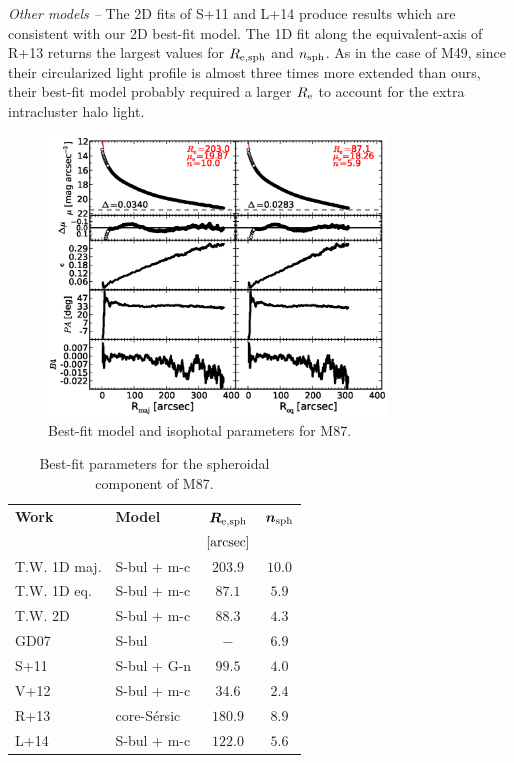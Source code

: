 \documentclass[preprint2]{emulateapj}
\newcommand{\fitfigurewidth}{0.8\textwidth}
\begin{document}
  \emph{Other models -- } 
  The 2D fits of S+11 and L+14 produce results which are consistent with our 2D best-fit model. 
  The 1D fit along the equivalent-axis of R+13 returns the largest values for $R_{\rm e,sph}$ and $n_{\rm sph}$. 
  As in the case of M49, since their circularized light profile is almost three times more extended than ours, 
  their best-fit model probably required a larger $R_{\rm e}$ to account for the extra intracluster halo light.


  \begin{figure}[h]
  \begin{center}
  \includegraphics[width=\fitfigurewidth]{images/m87_1Dfit.eps}
  \caption{Best-fit model and isophotal parameters for M87.}
  \end{center}
  \end{figure}

  \begin{table}[h]
  \small
  \caption{Best-fit parameters for the spheroidal component of M87.}
  \begin{center}
  \begin{tabular}{llcc}
  \hline
  {\bf Work} & {\bf Model}   & $\bm R_{\rm e,sph}$    & $\bm n_{\rm sph}$ \\
    &  &  $[\rm arcsec]$ & \\
  \hline
  T.W. 1D maj. & S-bul + m-c  & $203.9$  &  $10.0$ \\
  T.W. 1D eq.  & S-bul + m-c  & $87.1$   &  $5.9$ \\
  T.W. 2D      & S-bul + m-c  & $88.3$   &  $4.3$ \\
  \hline
  GD07      & S-bul	    & $-$     &  $6.9$ \\
  S+11      & S-bul + G-n   & $99.5$  &  $4.0$ \\
  V+12      & S-bul + m-c   & $34.6$  &  $2.4$ \\
  R+13      & core-S\'ersic & $180.9$ &  $8.9$ \\
  L+14      & S-bul + m-c   & $122.0$ &  $5.6$ \\
  \hline
  \end{tabular}
  \end{center}
  \label{tab:m87}
  \end{table}
\end{document}
